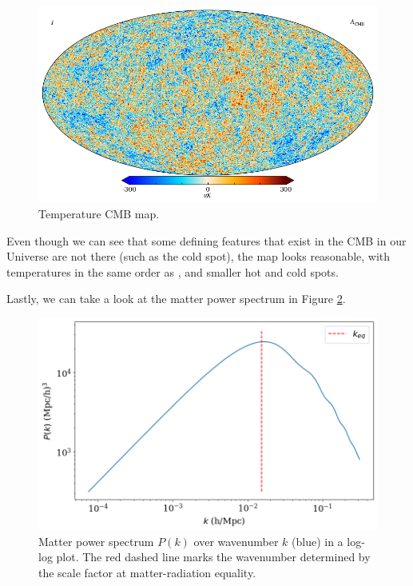 \documentclass{aa}
\begin{document}
\begin{figure}[ht]
    \centering
    \includegraphics[width=\linewidth]{report/figures/cmb_map_TT.png}
    \caption{Temperature CMB map.}
    \label{fig:cmb-map}
\end{figure}

Even though we can see that some defining features that exist in the CMB in our Universe are not there (such as the cold spot), the map looks reasonable, with temperatures in the same order as \cite{2020}, and smaller hot and cold spots.

Lastly, we can take a look at the matter power spectrum in Figure \ref{fig:ps-matter}.

\begin{figure}[ht]
    \centering
    \includegraphics[width=\linewidth]{report/figures/matter_power_spectrum.png}
    \caption{Matter power spectrum $P(k)$ over wavenumber $k$ (blue) in a log-log plot. The red dashed line marks the wavenumber determined by the scale factor at matter-radiation equality.}
    \label{fig:ps-matter}
\end{figure}
\end{document}
